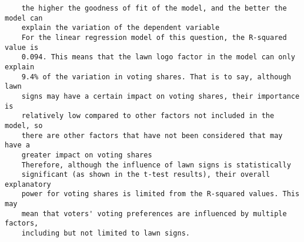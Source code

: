 \documentclass[12pt,letterpaper]{article}
\begin{document}
\begin{enumerate}
\begin{verbatim}
	the higher the goodness of fit of the model, and the better the model can 
	explain the variation of the dependent variable
	For the linear regression model of this question, the R-squared value is 
	0.094. This means that the lawn logo factor in the model can only explain 
	9.4% of the variation in voting shares. That is to say, although lawn 
	signs may have a certain impact on voting shares, their importance is 
	relatively low compared to other factors not included in the model, so 
	there are other factors that have not been considered that may have a 
	greater impact on voting shares
	Therefore, although the influence of lawn signs is statistically 
	significant (as shown in the t-test results), their overall explanatory 
	power for voting shares is limited from the R-squared values. This may 
	mean that voters' voting preferences are influenced by multiple factors, 
	including but not limited to lawn signs.
   \end{verbatim}
	
\end{enumerate}  
\end{document}
